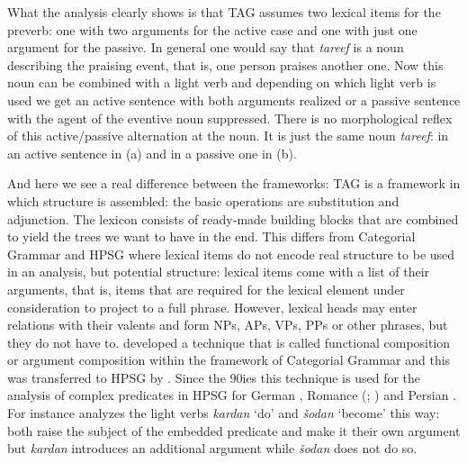 What the analysis clearly shows is that TAG assumes two lexical items for the preverb: one with two
arguments for the active case and one with just one argument
for the passive. In general one would
say that \emph{tareef} is a noun describing the praising event, that is, one 
person praises another one. Now this noun can be combined with a light verb and depending on which
light verb is used we get an active sentence with both arguments realized or a passive sentence with
the agent of the eventive noun suppressed. There is no morphological reflex of this active/passive
alternation at the noun. It is just the same noun \emph{tareef}: in an active sentence in (a)
and in a passive one in (b).

And here we see a real difference between the frameworks: TAG is a framework in which structure is
assembled: the basic operations are substitution and adjunction. The lexicon consists of ready-made
building blocks that are combined to yield the trees we want to have in the end. This differs from
Categorial Grammar %
and HPSG %
where lexical items do not
encode real structure to be used in an analysis, but potential structure: lexical items come with a
list of their arguments, that is, items that are required for the lexical element under
consideration to project to a full phrase. However, lexical heads may enter
relations with their valents and form NPs, APs, VPs, PPs or other phrases, but they do not have
to. \citet{Geach70a} developed a technique that is called functional composition or argument
composition within the framework of Categorial Grammar and this was transferred to HPSG by
\citet{HN89a,HN94a}. Since the 90ies this technique is used for the analysis of complex predicates
in HPSG for German \citep{HN89a,HN94a,Kiss95a,Meurers99a,Mueller99a,Kathol2000a},
Romance (\citealp[]{MS97a-u}; \citealp{Monachesi98a}) and Persian \citep{MuellerPersian}. For instance \citet[]{MuellerPersian} analyzes the light verbs \emph{kardan} `do' and \emph{šodan} `become' this
way: both raise the subject of the embedded predicate and make it their own argument but
\emph{kardan} introduces an additional argument while \emph{šodan} does not do so.

